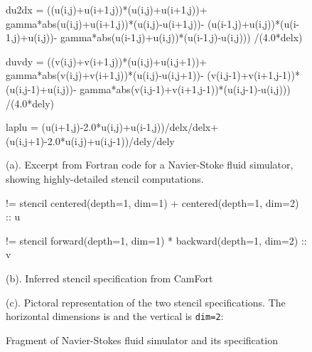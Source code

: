 \documentclass[9pt]{sigplanconf}
\theoremstyle{definition}
\begin{document}
\begin{figure}[t]
\begin{ExmVerbatim}[firstnumber=20]
du2dx = ((u(i,j)+u(i+1,j))*(u(i,j)+u(i+1,j))+
    gamma*abs(u(i,j)+u(i+1,j))*(u(i,j)-u(i+1,j))-
    (u(i-1,j)+u(i,j))*(u(i-1,j)+u(i,j))-
    gamma*abs(u(i-1,j)+u(i,j))*(u(i-1,j)-u(i,j)))
    /(4.0*delx)

duvdy = ((v(i,j)+v(i+1,j))*(u(i,j)+u(i,j+1))+
   gamma*abs(v(i,j)+v(i+1,j))*(u(i,j)-u(i,j+1))-
   (v(i,j-1)+v(i+1,j-1))*(u(i,j-1)+u(i,j))-
   gamma*abs(v(i,j-1)+v(i+1,j-1))*(u(i,j-1)-u(i,j)))
   /(4.0*dely)

laplu = (u(i+1,j)-2.0*u(i,j)+u(i-1,j))/delx/delx+
          (u(i,j+1)-2.0*u(i,j)+u(i,j-1))/dely/dely
\end{ExmVerbatim}
(a). Excerpt from Fortran code for a Navier-Stoke fluid simulator,
showing highly-detailed stencil computations. \\


\begin{SpecVerbatim}[xleftmargin=0.3cm]
!=   stencil centered(depth=1, dim=1)
           + centered(depth=1, dim=2) :: u

!=   stencil forward(depth=1, dim=1)
           * backward(depth=1, dim=2) :: v
\end{SpecVerbatim}
(b). Inferred stencil specification from CamFort

\begin{center}
\end{center}
(c). Pictoral representation of the two stencil specifications.
The horizontal dimensions is  and the vertical is \texttt{dim=2}:
\caption{Fragment of Navier-Stokes fluid simulator and its specification}
\label{ref:navier-stokes-fragment}
\end{figure}
\end{document}
